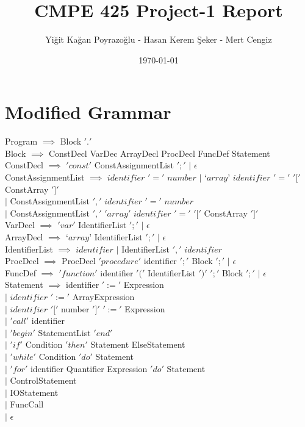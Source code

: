 \documentclass[a4paper,11pt]{article}
\title{CMPE 425 Project-1 Report}
\author{Yiğit Kağan Poyrazoğlu - Hasan Kerem Şeker - Mert Cengiz}
\date{\today}
\begin{document}
\maketitle

\section{Modified Grammar}

\begin{tcolorbox}

Program $\implies$ Block $'.'$   \\
Block $\implies$ ConstDecl VarDec ArrayDecl ProcDecl FuncDef Statement \\ 
ConstDecl $\implies$ $'const'$ ConstAssignmentList $';'$ $ | $ $\epsilon$ \\

ConstAssignmentList $\implies$ $identifier$ $'='$ $number$  
 $|$ $‘array’$ $identifier$ $'='$ $'['$ ConstArray $']'$ \\ \indent $|$ ConstAssignmentList $','$ $identifier$ $'='$ $number$ \\ \indent \indent
$|$ ConstAssignmentList $','$ $'array'$ $identifier$ $'='$ $'['$ ConstArray $']'$ \\

VarDecl $\implies$ $'var'$ IdentifierList $';'$ $|$  $\epsilon$
\\ ArrayDecl $\implies$ $‘array’$ IdentifierList $';'$ $|$ $\epsilon$ \\
IdentifierList $\implies$ $identifier$ 
                $|$ IdentifierList $','$ $identifier$ \\
ProcDecl $\implies$ ProcDecl $'procedure'$ identifier $';'$ Block $';'$ $|$ $\epsilon$ \\
FuncDef $\implies$ $'function'$ identifier $'('$ IdentifierList $')'$ $';'$ Block $';'$ $|$ $\epsilon$ \\

Statement $\implies$ identifier $':='$ Expression 
\\  $|$ $identifier$ $':='$ ArrayExpression 
\\  $|$ $identifier$ $'['$ number $']'$ $':='$ Expression
\\  $|$ $'call'$ identifier
\\  $|$ $'begin'$ StatementList $'end'$
\\  $|$ $'if'$ Condition $'then'$ Statement ElseStatement
\\  $|$ $'while'$ Condition $'do'$ Statement
\\  $|$ $'for'$ identifier Quantifier Expression $'do'$ Statement 
\\  $|$ ControlStatement         
\\  $|$ IOStatement              
\\  $|$ FuncCall 
\\  $|$ $\epsilon$ \\


\end{tcolorbox}
\end{document}
